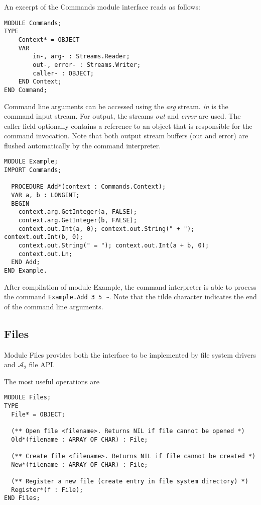 \documentclass[a4paper,11pt]{article}
\newcommand{\AZ}{\ensuremath{\mathcal{A}_{2}}\xspace}
\begin{document}
An excerpt of the Commands module interface reads as follows:
\begin{lstlisting}[language=Oberon,frame=none,caption={Command Context}]
MODULE Commands;
TYPE
    Context* = OBJECT
    VAR
        in-, arg- : Streams.Reader;
        out-, error- : Streams.Writer;
        caller- : OBJECT;
    END Context;
END Command;
\end{lstlisting}

Command line arguments can be accessed using the \emph{arg} stream. \emph{in} is the command input stream. For output, the streams \emph{out} and \emph{error} are used.
The caller field optionally contains a reference to an object that is responsible for the command invocation. Note that both output stream buffers (out and error) are flushed automatically by the command interpreter.

\begin{lstlisting}[language=Oberon,frame=none,caption={Command Example}]
MODULE Example;
IMPORT Commands;

  PROCEDURE Add*(context : Commands.Context);
  VAR a, b : LONGINT;
  BEGIN
    context.arg.GetInteger(a, FALSE);
    context.arg.GetInteger(b, FALSE);
    context.out.Int(a, 0); context.out.String(" + "); context.out.Int(b, 0);
    context.out.String(" = "); context.out.Int(a + b, 0);
    context.out.Ln;
  END Add;
END Example.
\end{lstlisting}

After compilation of module Example, the command interpreter is able to process the command
\verb+Example.Add 3 5 ~+.
Note that the tilde character indicates the end of the command line arguments.

\subsection{Files}
Module Files provides both the interface to be implemented by file system drivers and \AZ file API.

The most useful operations are
\begin{lstlisting}[language=Oberon,frame=none,caption={Basic Files API}]
MODULE Files;
TYPE
  File* = OBJECT;

  (** Open file <filename>. Returns NIL if file cannot be opened *)
  Old*(filename : ARRAY OF CHAR) : File;

  (** Create file <filename>. Returns NIL if file cannot be created *)
  New*(filename : ARRAY OF CHAR) : File;

  (** Register a new file (create entry in file system directory) *)
  Register*(f : File);
END Files;
\end{lstlisting}
\end{document}
